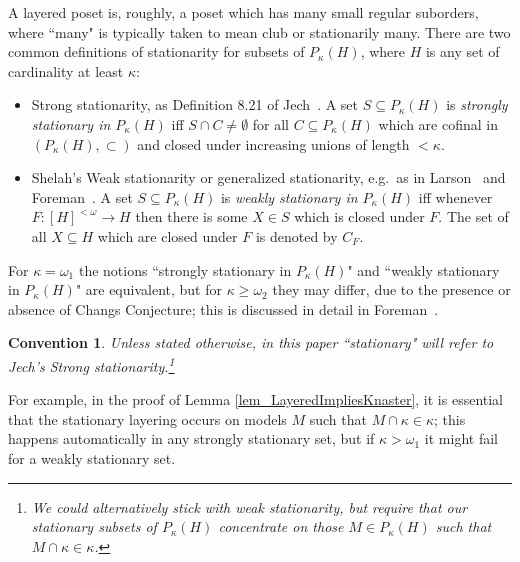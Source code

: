 \documentclass{amsart}
\newtheorem{convention}[theorem]{Convention}
\begin{document}
A layered poset is, roughly, a poset which has many small regular suborders, where ``many" is typically taken to mean club or stationarily many.  There are two common definitions of stationarity for subsets of $P_\kappa(H)$, where $H$ is any set of cardinality at least $\kappa$:
\begin{itemize}
 \item Strong stationarity, as Definition 8.21 of Jech~\cite{MR1940513}.  A set $S \subseteq P_\kappa(H)$ is \emph{strongly stationary in $P_\kappa(H)$} iff $S \cap C \ne \emptyset$ for all $C \subseteq P_\kappa(H)$ which are cofinal in $(P_\kappa(H), \subset)$ and closed under increasing unions of length $<\kappa$.
 \item Shelah's Weak stationarity or generalized stationarity, e.g.\ as in Larson~\cite{MR2069032} and Foreman~\cite{MattHandbook}.  A set $S \subseteq P_\kappa(H)$ is \emph{weakly stationary in $P_\kappa(H)$} iff whenever $F: [H]^{<\omega} \to H$ then there is some $X \in S$ which is closed under $F$.  The set of all $X \subseteq H$ which are closed under $F$ is denoted by $C_F$.  
\end{itemize}
For $\kappa = \omega_1$ the notions ``strongly stationary in $P_\kappa(H)$" and ``weakly stationary in $P_\kappa(H)$" are equivalent, but for $\kappa \ge \omega_2$ they may differ, due to the presence or absence of Changs Conjecture; this is discussed in detail in Foreman~\cite{MattHandbook}.  
\begin{convention}\label{conv_JechStat}
Unless stated otherwise, in this paper ``stationary" will refer to Jech's Strong stationarity.\footnote{We could alternatively stick with weak stationarity, but require that our stationary subsets of $P_\kappa(H)$ concentrate on those $M \in P_\kappa(H)$ such that $M \cap \kappa \in \kappa$.}
\end{convention}
For example, in the proof of Lemma \ref{lem_LayeredImpliesKnaster}, it is essential that the stationary layering occurs on models $M$ such that $M \cap \kappa \in \kappa$; this happens automatically in any strongly stationary set, but if $\kappa > \omega_1$ it might fail for a weakly stationary set.  
\end{document}
